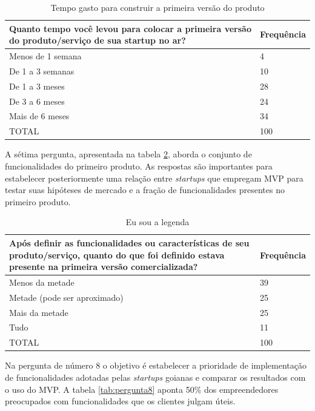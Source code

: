 \begin{table}[hb]
\centering
\caption{Tempo gasto para construir a primeira vers\~ao do produto}
\label{tab:pergunta6}
\begin{tabular}{|p{10cm}|p{2cm}|}
\hline{\bf Quanto tempo voc\^e levou para colocar a primeira vers\~ao do produto/servi\c{c}o de sua startup no ar?} & {\bf Frequ\^encia}\\
\hline Menos de 1 semana & 4\\
\hline De 1 a 3 semanas & 10\\
\hline De 1 a 3 meses & 28\\
\hline De 3 a 6 meses & 24\\
\hline Mais de 6 meses & 34\\
\hline TOTAL & 100\\
\hline
\end{tabular}
\end{table}

A s\'etima pergunta, apresentada na tabela \ref{tab:pergunta7}, aborda o conjunto de funcionalidades do primeiro produto. As respostas s\~ao importantes para estabelecer posteriormente uma rela\c{c}\~ao entre \emph{startups} que empregam MVP para testar suas hip\'oteses de mercado e a fra\c{c}\~ao de funcionalidades presentes no primeiro produto.

\begin{table}[hb]
\centering
\caption{Eu sou a legenda}
\label{tab:pergunta7}
\begin{tabular}{|p{10cm}|p{2cm}|}
\hline{\bf Ap\'os definir as funcionalidades ou caracter\'isticas de seu produto/servi\c{c}o, quanto do que foi definido estava presente na primeira vers\~ao comercializada?} & {\bf Frequ\^encia}\\
\hline Menos da metade & 39\\
\hline Metade (pode ser aproximado) & 25\\
\hline Mais da metade & 25\\
\hline Tudo & 11\\
\hline TOTAL & 100\\
\hline
\end{tabular}
\end{table}

\pagebreak

Na pergunta de n\'umero 8 o objetivo \'e estabelecer a prioridade de implementa\c{c}\~ao de funcionalidades adotadas pelas \emph{startups} goianas e comparar os resultados com o uso do MVP. A tabela \ref{tab:pergunta8} aponta 50\% dos empreendedores preocupados com funcionalidades que os clientes julgam \'uteis.

